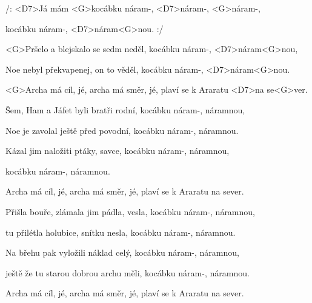 

\zr
/: <D7>Já mám <G>kocábku náram-, <D7>náram-, <G>náram-,

kocábku náram-, <D7>náram<G>nou. :/
\kr

\zs
<G>Pršelo a blejskalo se sedm neděl,
kocábku náram-, <D7>náram<G>nou,

Noe nebyl překvapenej, on to věděl,
kocábku náram-, <D7>náram<G>nou.
\ks

\zr \kr

\zr
<G>Archa má cíl, jé, archa má směr, jé,
plaví se k Araratu <D7>na se<G>ver.
\kr

\zr \kr

\zs
Šem, Ham a Jáfet byli bratři rodní,
kocábku náram-, náramnou,

Noe je zavolal ještě před povodní,
kocábku náram-, náramnou.
\ks

\zs
Kázal jim naložiti ptáky, savce,
kocábku náram-, náramnou,

kocábku náram-, náramnou.
\ks

\zr \kr

\zr
Archa má cíl, jé, archa má směr, jé,
plaví se k Araratu na sever.
\kr

\zr \kr

\zs
Přišla bouře, zlámala jim pádla, vesla,
kocábku náram-, náramnou,

tu přilétla holubice, snítku nesla,
kocábku náram-, náramnou.
\ks

\zs
Na břehu pak vyložili náklad celý,
kocábku náram-, náramnou,

ještě že tu starou dobrou archu měli,
kocábku náram-, náramnou.
\ks

\zr \kr

\zr
Archa má cíl, jé, archa má směr, jé,
plaví se k Araratu na sever.
\kr

\zr \kr

\kp

